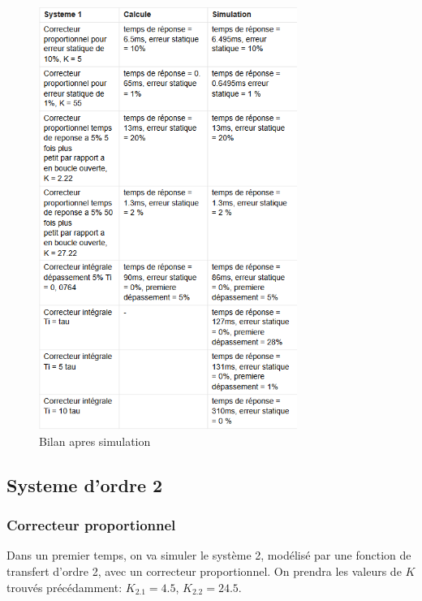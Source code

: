 \documentclass[12pt, a4paper]{report}
\begin{document}
\begin{figure}[H]
    \centering
    \includegraphics[width=0.75\textwidth]{bilan2.png}
    \caption{Bilan apres simulation}
\end{figure}

\subsection{Systeme d'ordre 2}

\subsubsection{Correcteur proportionnel}

Dans un premier temps, on va simuler le système 2, modélisé par une fonction de transfert d'ordre 2, avec un correcteur proportionnel. On prendra les valeurs de $K$ trouvés précédamment: $K_{2.1} = 4.5$, $K_{2.2} = 24.5$.
\end{document}
